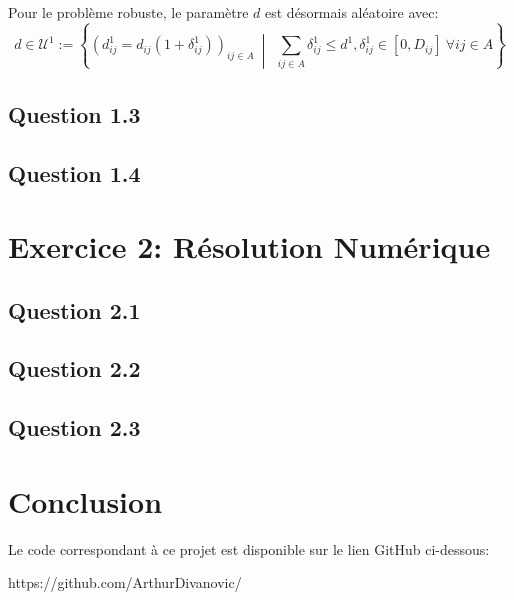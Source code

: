 \documentclass{article}
\begin{document}
Pour le problème robuste, le paramètre $d$ est désormais aléatoire avec:
\[
d \in \mathcal{U}^{1} := \left\{(d^{1}_{ij} = d_{ij}(1 + \delta^{1}_{ij}))_{ij \in A} \ \middle|\ \ \sum_{ij \in A} \delta^{1}_{ij} \leq d^{1}, \delta^{1}_{ij} \in [0, D_{ij}] \ \forall ij \in A\right\}
\]



\subsection{Question 1.3}

\subsection{Question 1.4}





\newpage

\section{Exercice 2: Résolution Numérique}

\subsection{Question 2.1}

\subsection{Question 2.2}

\subsection{Question 2.3}




\newpage
\section*{Conclusion}



\vspace{2cm}
Le code correspondant à ce projet est disponible sur le lien GitHub ci-dessous:
\\
\begin{center}
https://github.com/ArthurDivanovic/
\end{center}



\newpage

% 
\end{document}
